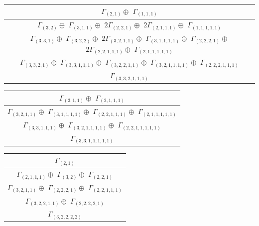 \documentclass[main.tex]{subfiles}
\begin{document}
\begin{minipage}{1\textwidth}
\centering
\begin{tabular}{c}
$\Gamma_{(
2 , 
1
)} \oplus$
$\Gamma_{(
1 , 
1 , 
1
)}$
\\ \hline
$\Gamma_{(
3 , 
2
)} \oplus$
$\Gamma_{(
3 , 
1 , 
1
)} \oplus$
$2\Gamma_{(
2 , 
2 , 
1
)} \oplus$
$2\Gamma_{(
2 , 
1 , 
1 , 
1
)} \oplus$
$\Gamma_{(
1 , 
1 , 
1 , 
1 , 
1
)}$
\\ \hline
$\Gamma_{(
3 , 
3 , 
1
)} \oplus$
$\Gamma_{(
3 , 
2 , 
2
)} \oplus$
$2\Gamma_{(
3 , 
2 , 
1 , 
1
)} \oplus$
$\Gamma_{(
3 , 
1 , 
1 , 
1 , 
1
)} \oplus$
$\Gamma_{(
2 , 
2 , 
2 , 
1
)} \oplus$
$2\Gamma_{(
2 , 
2 , 
1 , 
1 , 
1
)} \oplus$
$\Gamma_{(
2 , 
1 , 
1 , 
1 , 
1 , 
1
)}$
\\ \hline
$\Gamma_{(
3 , 
3 , 
2 , 
1
)} \oplus$
$\Gamma_{(
3 , 
3 , 
1 , 
1 , 
1
)} \oplus$
$\Gamma_{(
3 , 
2 , 
2 , 
1 , 
1
)} \oplus$
$\Gamma_{(
3 , 
2 , 
1 , 
1 , 
1 , 
1
)} \oplus$
$\Gamma_{(
2 , 
2 , 
2 , 
1 , 
1 , 
1
)}$
\\ \hline
$\Gamma_{(
3 , 
3 , 
2 , 
1 , 
1 , 
1
)}$
\\
\end{tabular}\end{minipage}
\bigskip
\begin{minipage}{.6\textwidth}
\centering
\begin{tabular}{c}
$\Gamma_{(
3 , 
1 , 
1
)} \oplus$
$\Gamma_{(
2 , 
1 , 
1 , 
1
)}$
\\ \hline
$\Gamma_{(
3 , 
2 , 
1 , 
1
)} \oplus$
$\Gamma_{(
3 , 
1 , 
1 , 
1 , 
1
)} \oplus$
$\Gamma_{(
2 , 
2 , 
1 , 
1 , 
1
)} \oplus$
$\Gamma_{(
2 , 
1 , 
1 , 
1 , 
1 , 
1
)}$
\\ \hline
$\Gamma_{(
3 , 
3 , 
1 , 
1 , 
1
)} \oplus$
$\Gamma_{(
3 , 
2 , 
1 , 
1 , 
1 , 
1
)} \oplus$
$\Gamma_{(
2 , 
2 , 
1 , 
1 , 
1 , 
1 , 
1
)}$
\\ \hline
$\Gamma_{(
3 , 
3 , 
1 , 
1 , 
1 , 
1 , 
1
)}$
\\
\end{tabular}\end{minipage}
\begin{minipage}{.4\textwidth}
\centering
\begin{tabular}{c}
$\Gamma_{(
2 , 
1
)}$
\\ \hline
$\Gamma_{(
2 , 
1 , 
1 , 
1
)} \oplus$
$\Gamma_{(
3 , 
2
)} \oplus$
$\Gamma_{(
2 , 
2 , 
1
)}$
\\ \hline
$\Gamma_{(
3 , 
2 , 
1 , 
1
)} \oplus$
$\Gamma_{(
2 , 
2 , 
2 , 
1
)} \oplus$
$\Gamma_{(
2 , 
2 , 
1 , 
1 , 
1
)}$
\\ \hline
$\Gamma_{(
3 , 
2 , 
2 , 
1 , 
1
)} \oplus$
$\Gamma_{(
2 , 
2 , 
2 , 
2 , 
1
)}$
\\ \hline
$\Gamma_{(
3 , 
2 , 
2 , 
2 , 
2
)}$
\\
\end{tabular}\end{minipage}
\end{document}
